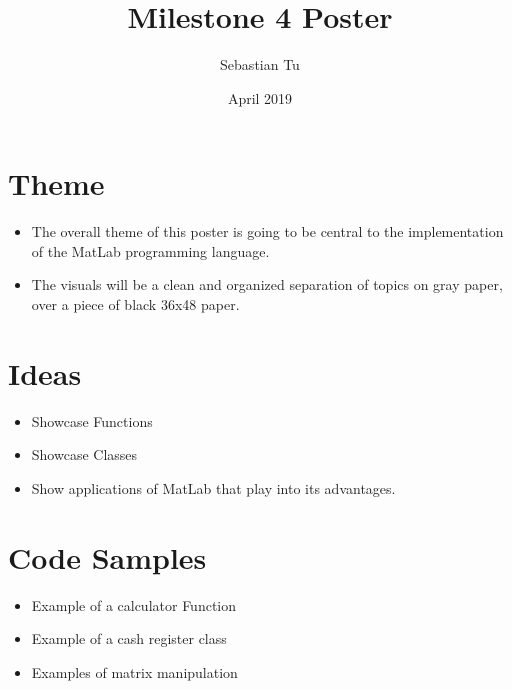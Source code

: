 \documentclass{article}
\title{Milestone 4 Poster}
\author{Sebastian Tu }
\date{April 2019}
\begin{document}
\maketitle
\section{Theme}

\begin{itemize}
  \item The overall theme of this poster is going to be central to the implementation of the MatLab programming language.
  \item The visuals will be a clean and organized separation of topics on gray paper, over a piece of black 36x48 paper.
\end{itemize}

\section{Ideas}
\begin{itemize}
  \item Showcase Functions
  \item Showcase Classes
  \item Show applications of MatLab that play into its advantages.
\end{itemize}

\section{Code Samples}
\begin{itemize}
  \item Example of a calculator Function
  \item Example of a cash register class
  \item Examples of matrix manipulation
\end{itemize}
\end{document}
